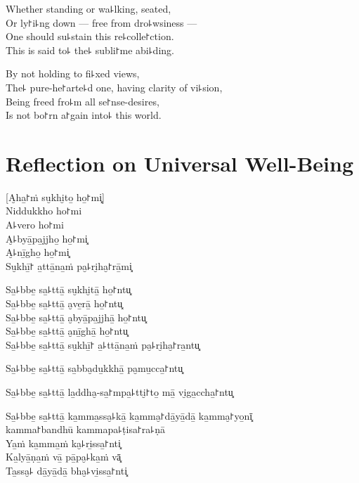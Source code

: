 Whether standing or wa꜕lking, seated, \\
Or ly꜓i꜕ng down --- free from dro꜕wsiness ---\\
One should su꜕stain this re꜕colle꜓ction.\\
This is said to꜕  the꜕ subli꜓me abi꜕ding.

By not holding to fi꜕xed views,\\
The꜕ pure-he꜓arte꜕d one, having clarity of vi꜕sion,\\
Being freed fro꜕m all se꜓nse-desires,\\
Is not bo꜓rn a꜓gain into꜕ this world.

\chapter*[Universal Well-Being]{Reflection on Universal Well-Being}


\delegateSetUseNext

\begin{leader}
\end{leader}

[A̮ha̱꜓ṁ su̮khi̮to̱ ho̱꜓mi͓]\\
Niddukkho ho꜓mi\\
A꜕vero ho꜓mi\\
A̮꜕byā̱pa̱jjho̱ ho̱꜓mi͓\\
A̮꜕nī̱gho̱ ho̱꜓mi͓\\
Su̮khī̱꜓ a̱ttā̱na̱ṁ pa̮꜕ri̮ha̮꜓rā̱mi͓

Sa̱꜕bbe̱ sa̱꜕ttā̱ su̮khi̮tā̱ ho̱꜓ntu͓\\
Sa̱꜕bbe̱ sa̱꜕ttā̱ a̮ve̱rā̱ ho̱꜓ntu͓\\
Sa̱꜕bbe̱ sa̱꜕ttā̱ a̮byā̱pa̱jjhā̱ ho̱꜓ntu͓\\
Sa̱꜕bbe̱ sa̱꜕ttā̱ a̮nī̱ghā̱ ho̱꜓ntu͓\\
Sa̱꜕bbe̱ sa̱꜕ttā̱ su̮khī̱꜓ a̱꜕ttā̱na̱ṁ pa̮꜕ri̮ha̮꜓ra̱ntu͓

Sa̱꜕bbe̱ sa̱꜕ttā̱ sa̱bba̮du̱kkhā̱ pa̮mu̱cca̱꜓ntu͓

Sa̱꜕bbe̱ sa̱꜕ttā̱ la̱ddha̮-sa̱꜓mpa̱꜕tti̮꜓to̱ mā̱ vi̮ga̱ccha̱꜓ntu͓

Sa̱꜕bbe̱ sa̱꜕ttā̱ ka̱mma̱ssa̮꜕kā̱ ka̱mma̮꜓dā̱yā̱dā̱ ka̱mma̮꜓yo̱nī͓\\
\vin kamma꜓bandhū kammapa꜕ṭisa꜓ra꜕ṇā\\
Ya̱ṁ ka̱mma̱ṁ ka̮꜕ri̱ssa̱꜓nti͓\\
Ka̱lyā̱ṇa̱ṁ vā̱ pā̱pa̮꜕ka̱ṁ vā͓\\
Ta̱ssa̮꜕ dā̱yā̱dā̱ bha̮꜕vi̱ssa̱꜓nti͓

